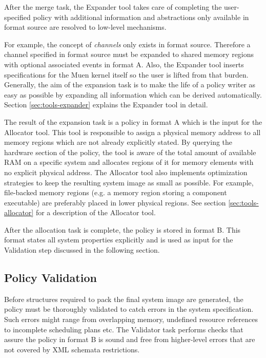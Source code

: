 \documentclass[a4paper,twoside,titlepage]{article}
\begin{document}
After the merge task, the Expander tool takes care of completing the
user-specified policy with additional information and abstractions only
available in format source are resolved to low-level mechanisms.

For example, the concept of \emph{channels} only exists in format source.
Therefore a channel specified in format source must be expanded to shared memory
regions with optional associated events in format A.  Also, the Expander tool
inserts specifications for the Muen kernel itself so the user is lifted from
that burden. Generally, the aim of the expansion task is to make the life of a
policy writer as easy as possible by expanding all information which can be
derived automatically. Section \ref{sec:tools-expander} explains the Expander
tool in detail.

The result of the expansion task is a policy in format A which is the input for
the Allocator tool. This tool is responsible to assign a physical memory
address to all memory regions which are not already explicitly stated. By
querying the hardware section of the policy, the tool is aware of the total
amount of available RAM on a specific system and allocates regions of it for
memory elements with no explicit physical address.  The Allocator tool also
implements optimization strategies to keep the resulting system image as small
as possible.  For example, file-backed memory regions (e.g. a memory region
storing a component executable) are preferably placed in lower physical
regions. See section \ref{sec:tools-allocator} for a description of the
Allocator tool.

After the allocation task is complete, the policy is stored in format B. This
format states all system properties explicitly and is used as input for the
Validation step discussed in the following section.

\subsection{Policy Validation}
\label{subsec:policy_validation}
Before structures required to pack the final system image are generated, the
policy must be thoroughly validated to catch errors in the system
specification.  Such errors might range from overlapping memory, undefined
resource references to incomplete scheduling plans etc. The Validator task
performs checks that assure the policy in format B is sound and free from
higher-level errors that are not covered by XML schemata restrictions.
\end{document}
